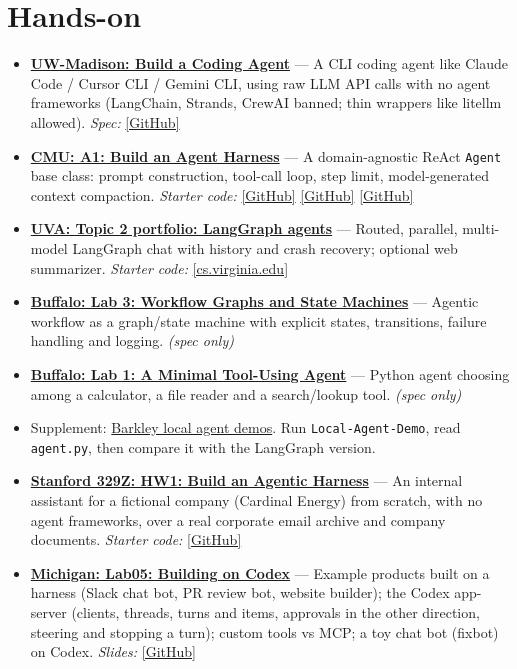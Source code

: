 \documentclass[10pt,oneside]{report}
\begin{document}
\section{Hands-on}
\begin{itemize}
\item \hyperlink{asg-UW-1}{\textbf{UW-Madison: Build a Coding Agent}} --- A CLI coding agent like Claude Code / Cursor CLI / Gemini CLI, using raw LLM API calls with no agent frameworks (LangChain, Strands, CrewAI banned; thin wrappers like litellm allowed). \textit{Spec:} \href{https://github.com/barghouthi/ai-agents/blob/main/assignment.md}{[GitHub]}
\item \hyperlink{asg-CMU-1}{\textbf{CMU: A1: Build an Agent Harness}} --- A domain-agnostic ReAct \texttt{Agent} base class: prompt construction, tool-call loop, step limit, model-generated context compaction. \textit{Starter code:} \href{https://github.com/cmu-agents/assignment-1}{[GitHub]} \href{https://github.com/cmu-agents/assignment-1/blob/main/ASSIGNMENT.md}{[GitHub]} \href{https://github.com/cmu-agents/chess-app}{[GitHub]}
\item \hyperlink{asg-UVA-2}{\textbf{UVA: Topic 2 portfolio: LangGraph agents}} --- Routed, parallel, multi-model LangGraph chat with history and crash recovery; optional web summarizer. \textit{Starter code:} \href{https://www.cs.virginia.edu/\%7Ermw7my/Courses/AgenticAISpring2026/Topic2Frameworks/Agent\%20Control\%20Flow\%20Frameworks.html}{[cs.virginia.edu]}
\item \hyperlink{asg-UB-3}{\textbf{Buffalo: Lab 3: Workflow Graphs and State Machines}} --- Agentic workflow as a graph/state machine with explicit states, transitions, failure handling and logging. \textit{(spec only)}
\item \hyperlink{asg-UB-1}{\textbf{Buffalo: Lab 1: A Minimal Tool-Using Agent}} --- Python agent choosing among a calculator, a file reader and a search/lookup tool. \textit{(spec only)}
\item Supplement: \hyperref[sup-barkley]{Barkley local agent demos}. Run \texttt{Local-Agent-Demo}, read \texttt{agent.py}, then compare it with the LangGraph version.
\item \hyperlink{asg-S329Z-1}{\textbf{Stanford 329Z: HW1: Build an Agentic Harness}} --- An internal assistant for a fictional company (Cardinal Energy) from scratch, with no agent frameworks, over a real corporate email archive and company documents. \textit{Starter code:} \href{https://github.com/cs329z/assignment1-harness}{[GitHub]}
\item \hyperlink{asg-UMICH-12}{\textbf{Michigan: Lab05: Building on Codex}} --- Example products built on a harness (Slack chat bot, PR review bot, website builder); the Codex app-server (clients, threads, turns and items, approvals in the other direction, steering and stopping a turn); custom tools vs MCP; a toy chat bot (fixbot) on Codex. \textit{Slides:} \href{https://github.com/eecs498-aase/materials/blob/main/labs/Lab05/slides.pdf}{[GitHub]}
\end{itemize}
\end{document}
